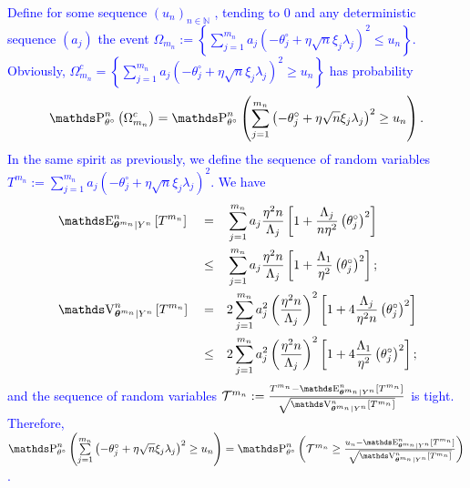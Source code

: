 \begin{pro}
\textcolor{blue}{
Define for some sequence $(u_{n})_{n \in \mathds{N}}$ , tending to $0$ and any deterministic sequence $(a_{j})$ the event $\Omega_{m_{n}} := \left\{\sum\limits_{j=1}^{m_{n}}a_{j}\left(- \theta^{\circ}_{j} + \eta \sqrt{n} \xi_{j} \lambda_{j}\right)^{2} \leq u_{n}\right\}.$\\
Obviously, $\Omega_{m_{n}}^{c} = \left\{\sum\limits_{j=1}^{m_{n}} a_{j} \left( - \theta^{\circ}_{j} + \eta \sqrt{n} \xi_{j} \lambda_{j}\right)^{2} \geq u_{n}\right\}$ has probability
\[\P_{\theta^{\circ}}^{n}\left(\Omega_{m_{n}}^{c}\right) = \P_{\theta^{\circ}}^{n}\left(\sum\limits_{j=1}^{m_{n}}\left(- \theta^{\circ}_{j} + \eta \sqrt{n} \xi_{j} \lambda_{j}\right)^{2} \geq u_{n}\right).\]
In the same spirit as previously, we define the sequence of random variables $T^{m_{n}} := \sum\limits_{j=1}^{m_{n}}a_{j}\left(- \theta^{\circ}_{j} + \eta \sqrt{n} \xi_{j} \lambda_{j}\right)^{2}.$
We have
\begin{alignat*}{3}
&\E_{\boldsymbol{\theta}^{m_{n}} \vert Y^{n}}^{n}\left[T^{m_{n}}\right] &&=&& \sum\limits_{j = 1}^{m_{n}} a_{j} \frac{\eta^{2} n}{\Lambda_{j}} \left[1 + \frac{\Lambda_{j}}{n \eta^{2}} \left(\theta^{\circ}_{j} \right)^{2}\right]\\
& &&\leq&& \sum\limits_{j = 1}^{m_{n}} a_{j} \frac{\eta^{2} n}{\Lambda_{j}} \left[1 + \frac{\Lambda_{1}}{\eta^{2}} \left(\theta^{\circ}_{j}\right)^{2}\right];\\
&\V_{\boldsymbol{\theta}^{m_{n}} \vert Y^{n}}^{n}\left[T^{m_{n}}\right] &&=&& 2 \sum\limits_{j = 1}^{m_{n}} a_{j}^{2} \left(\frac{\eta^{2} n}{\Lambda_{j}}\right)^{2} \left[1 + 4 \frac{\Lambda_{j}}{\eta^{2} n} \left(\theta^{\circ}_{j}\right)^{2}\right]\\
& &&\leq&& 2 \sum\limits_{j = 1}^{m_{n}} a_{j}^{2} \left(\frac{\eta^{2} n}{\Lambda_{j}}\right)^{2} \left[1 + 4 \frac{\Lambda_{1}}{\eta^{2}} \left(\theta^{\circ}_{j}\right)^{2}\right];
\end{alignat*}
and the sequence of random variables $\mathcal{T}^{m_{n}} := \frac{T^{m_{n}} - \E_{\boldsymbol{\theta}^{m_{n}} \vert Y^{n}}^{n}\left[T^{m_{n}}\right]}{\sqrt{\V_{\boldsymbol{\theta}^{m_{n}} \vert Y^{n}}^{n}\left[T^{m_{n}}\right]}}$ is tight.
Therefore, $\P_{\theta^{\circ}}^{n}\left(\sum\limits_{j=1}^{m_{n}}\left(- \theta^{\circ}_{j} + \eta \sqrt{n} \xi_{j} \lambda_{j}\right)^{2} \geq u_{n}\right) = \P_{\theta^{\circ}}^{n}\left(\mathcal{T}^{m_{n}} \geq \frac{u_{n} - \E_{\boldsymbol{\theta}^{m_{n}} \vert Y^{n}}^{n}\left[T^{m_{n}}\right]}{\sqrt{\V_{\boldsymbol{\theta}^{m_{n}} \vert Y^{n}}^{n}\left[T^{m_{n}}\right]}}\right)$.
}
\end{pro}
